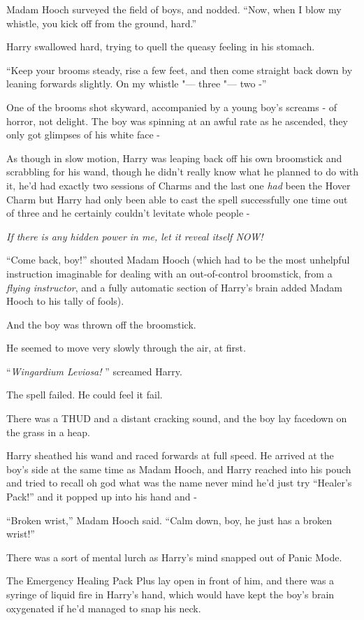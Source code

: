 Madam Hooch surveyed the field of boys, and nodded. ``Now, when I blow
my whistle, you kick off from the ground, hard.''

Harry swallowed hard, trying to quell the queasy feeling in his stomach.

``Keep your brooms steady, rise a few feet, and then come straight back
down by leaning forwards slightly. On my whistle "--- three "--- two -''

One of the brooms shot skyward, accompanied by a young boy's screams -
of horror, not delight. The boy was spinning at an awful rate as he
ascended, they only got glimpses of his white face -

As though in slow motion, Harry was leaping back off his own broomstick
and scrabbling for his wand, though he didn't really know what he
planned to do with it, he'd had exactly two sessions of Charms and the
last one \emph{had} been the Hover Charm but Harry had only been able to
cast the spell successfully one time out of three and he certainly
couldn't levitate whole people -

\emph{If there is any hidden power in me, let it reveal itself NOW!}

``Come back, boy!'' shouted Madam Hooch (which had to be the most
unhelpful instruction imaginable for dealing with an out-of-control
broomstick, from a \emph{flying instructor}, and a fully automatic
section of Harry's brain added Madam Hooch to his tally of fools).

And the boy was thrown off the broomstick.

He seemed to move very slowly through the air, at first.

``\emph{Wingardium Leviosa!} '' screamed Harry.

The spell failed. He could feel it fail.

There was a THUD and a distant cracking sound, and the boy lay facedown
on the grass in a heap.

Harry sheathed his wand and raced forwards at full speed. He arrived at
the boy's side at the same time as Madam Hooch, and Harry reached into
his pouch and tried to recall oh god what was the name never mind he'd
just try ``Healer's Pack!'' and it popped up into his hand and -

``Broken wrist,'' Madam Hooch said. ``Calm down, boy, he just has a
broken wrist!''

There was a sort of mental lurch as Harry's mind snapped out of Panic
Mode.

The Emergency Healing Pack Plus lay open in front of him, and there was
a syringe of liquid fire in Harry's hand, which would have kept the
boy's brain oxygenated if he'd managed to snap his neck.

